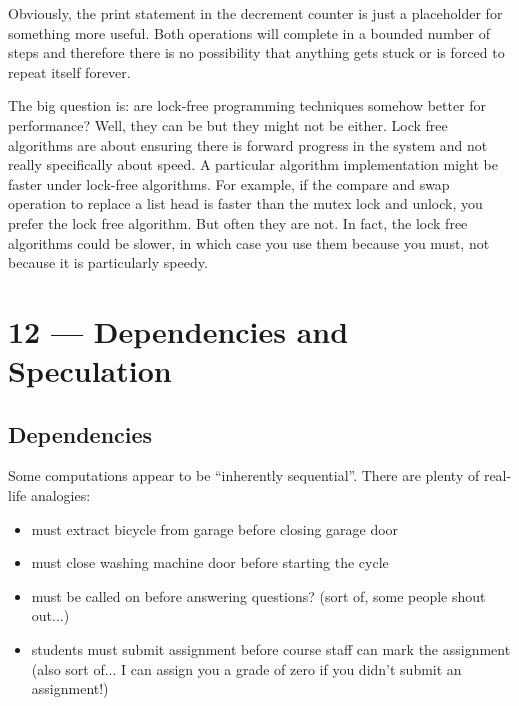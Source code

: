 \documentclass[a4paper]{report}
\begin{document}
Obviously, the print statement in the decrement counter is just a placeholder for something more useful. Both operations will complete in a bounded number of steps and therefore there is no possibility that anything gets stuck or is forced to repeat itself forever. 

The big question is: are lock-free programming techniques somehow better for performance? Well, they can be but they might not be either. Lock free algorithms are about ensuring there is forward progress in the system and not really specifically about speed. A particular algorithm implementation might be faster under lock-free algorithms. For example, if the compare and swap operation to replace a list head is faster than the mutex lock and unlock, you prefer the lock free algorithm. But often they are not. In fact, the lock free algorithms could be slower, in which case you use them because you must, not because it is particularly speedy.









\chapter*{12 --- Dependencies and Speculation}


\section*{Dependencies}
Some computations appear to be ``inherently sequential''. There are plenty of real-life analogies:

\begin{itemize}
\item must extract bicycle from garage before closing garage door
 
\item must close washing machine door before starting the cycle
 
\item must be called on before answering questions? (sort of, some people shout out...)
 
\item students must submit assignment before course staff can mark the assignment (also sort of... I can assign you a grade of zero if you didn't submit an assignment!)
\end{itemize}
\end{document}
